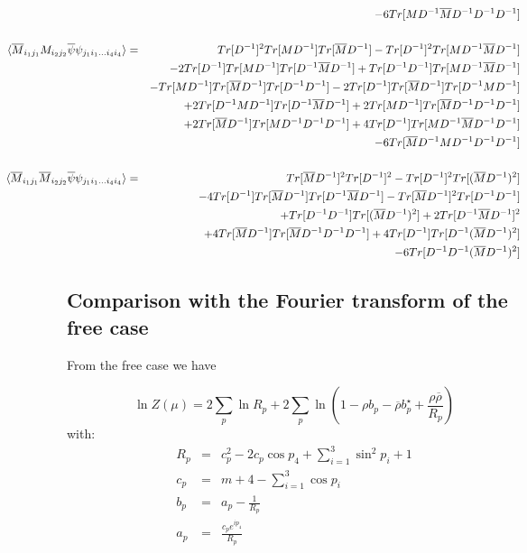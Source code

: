 \documentclass[a4paper,10pt]{report}
\newcommand{\ol}[1]{\overline{#1}}
\newcommand{\rrb}{\overline{\rho}}
\newcommand{\rr}{\rho}
\newcommand{\Mb}{\ol{M}}
\newcommand{\mv}[1]{\langle #1 \rangle}
\newcommand{\ppb}{\ol{\psi}\psi}
\newcommand{\D}{D^{-1}}
\begin{document}
\begin{eqnarray}
&& - 6 Tr[M\D\Mb\D\D\D]\nonumber\\
\nonumber\\
\hspace*{-19mm}\mv{\Mb_{i_1j_1}M_{i_2j_2} \ppb_{j_1i_1...i_4i_4}} &=&
Tr[\D]^2Tr[M\D]Tr[\Mb\D] - Tr[\D]^2Tr[M\D\Mb\D]\nonumber\\
&&- 2 Tr[\D]Tr[M\D]Tr[\D\Mb\D] + Tr[\D\D]Tr[M\D\Mb\D] \nonumber\\
&&- Tr[M\D]Tr[\Mb\D]Tr[\D\D] - 2 Tr[\D]Tr[\Mb\D]Tr[\D M \D]\nonumber\\
&& + 2 Tr[\D M\D]Tr[\D\Mb\D] + 2 Tr[M\D]Tr[\Mb\D\D\D]\nonumber\\
&& + 2 Tr[\Mb\D]Tr[M\D\D\D] + 4 Tr[\D]Tr[M\D\Mb\D\D]\nonumber\\
&& - 6 Tr[\Mb\D M\D\D\D]\nonumber\\
\nonumber\\
\hspace*{-19mm}\mv{\Mb_{i_1j_1}\Mb_{i_2j_2} \ppb_{j_1i_1...i_4i_4}} &=&
Tr[\Mb\D]^2 Tr[\D]^2 - Tr[\D]^2 Tr[(\Mb\D)^2] \nonumber\\
&& - 4 Tr[\D]Tr[\Mb\D]Tr[\D \Mb\D] - Tr[\Mb\D]^2 Tr[\D\D] \nonumber\\
&& + Tr[\D\D]Tr[(\Mb\D)^2] + 2 Tr[\D \Mb\D]^2\nonumber\\
&&   + 4 Tr[\Mb\D]Tr[\Mb\D\D\D] + 4 Tr[\D]Tr[\D(\Mb\D)^2]\nonumber \\
&& - 6 Tr[\D\D(\Mb\D)^2]\nonumber
\end{eqnarray}


\newpage
\subsection*{Comparison with the Fourier transform of the free case}

\noindent From the free case we have

\begin{equation}
\ln Z(\mu) = 2 \sum_p \ln R_p + 2 \sum_p \ln \left(1 - \rr b_p - \rrb b_p^\star + \frac{\rr\rrb}{R_p}\right)
\end{equation}
with:
\begin{eqnarray}
R_p &=& c_p^2 - 2 c_p \cos p_4 + \sum_{i=1}^3\sin^2 p_i + 1 \nonumber\\
c_p &=& m + 4 - \sum_{i=1}^3 \cos p_i \nonumber\\
b_p &=& a_p - \frac{1}{R_p} \nonumber\\
a_p &=& \frac{c_p e^{i p_4}}{R_p} \nonumber
\end{eqnarray}
\end{document}
